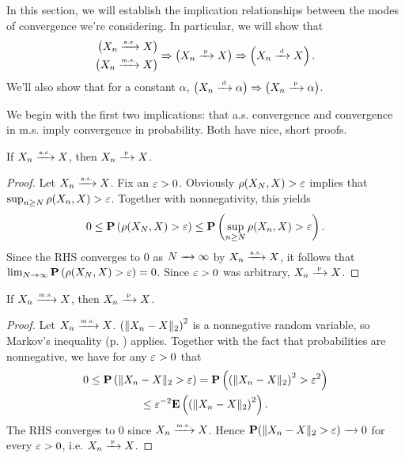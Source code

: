 \documentclass[11pt,letterpaper,reqno,oneside]{article}
\begin{document}
In this section, we will establish the implication relationships between the modes of convergence we're considering. In particular, we will show that
%
\begin{equation*}
	\begin{aligned}
		\left(X_n \xrightarrow{{\scriptscriptstyle \mathrm{a.s.}}} X\right)& \\
		\left(X_n \xrightarrow{{\scriptscriptstyle \mathrm{m.s.}}} X\right)&
	\end{aligned}
	\Rightarrow
	\left(X_n \xrightarrow{{\scriptscriptstyle \mathrm{\;p\;}}} X\right)
	\Rightarrow
	\left(X_n \xrightarrow{{\scriptscriptstyle \mathrm{\;d\;}}} X\right) .
\end{equation*}
%
We'll also show that for a constant $\alpha$, $\bigl(X_n \xrightarrow{{\scriptscriptstyle \mathrm{\;d\;}}} \alpha\bigr) \Rightarrow \bigl(X_n \xrightarrow{{\scriptscriptstyle \mathrm{\;p\;}}} \alpha\bigr)$.


We begin with the first two implications: that a.s. convergence and convergence in m.s. imply convergence in probability. Both have nice, short proofs.

\begin{proposition}
	If $X_n \xrightarrow{{\scriptscriptstyle \mathrm{a.s.}}} X$, then $X_n \xrightarrow{{\scriptscriptstyle \mathrm{\;p\;}}} X$.
\end{proposition}


\begin{proof}
	Let $X_n \xrightarrow{{\scriptscriptstyle \mathrm{a.s.}}} X$. Fix an $\varepsilon>0$. Obviously $\rho(X_N,X)>\varepsilon$ implies that $\sup_{n \geq N} \rho(X_n,X) > \varepsilon$. Together with nonnegativity, this yields
	\begin{equation*}
		0
		\leq \mathbf{P}\left( \rho(X_N,X) > \varepsilon \right)
		\leq \mathbf{P}\left( \sup_{n \geq N} \rho(X_n,X) > \varepsilon \right) .
	\end{equation*}
	Since the RHS converges to $0$ as $N \xrightarrow{\;\;\;} \infty$ by $X_n \xrightarrow{{\scriptscriptstyle \mathrm{a.s.}}} X$, it follows that $\lim_{N\to\infty} \mathbf{P}\left( \rho(X_N,X) > \varepsilon \right) = 0$. Since $\varepsilon>0$ was arbitrary, $X_n \xrightarrow{{\scriptscriptstyle \mathrm{\;p\;}}} X$.
\end{proof}


\begin{proposition}
	\label{proposition:convms_implies_convp}
	If $X_n \xrightarrow{{\scriptscriptstyle \mathrm{m.s.}}} X$, then $X_n \xrightarrow{{\scriptscriptstyle \mathrm{\;p\;}}} X$.
\end{proposition}

\begin{proof}
	Let $X_n \xrightarrow{{\scriptscriptstyle \mathrm{m.s.}}} X$. $\left(\lVert X_n-X\rVert_2\right)^2$ is a nonnegative random variable, so Markov's inequality (p. \pageref{proposition:Markovs_inequality}) applies. Together with the fact that probabilities are nonnegative, we have for any $\varepsilon>0$ that
	\begin{multline*}
		0
		\leq \mathbf{P}\left( \lVert X_n-X\rVert_2 > \varepsilon \right) 
		= \mathbf{P}\left( \left(\lVert X_n-X\rVert_2\right)^2 > \varepsilon^2 \right)
		\\
		\leq \varepsilon^{-2} \mathbf{E}\left( \left(\lVert X_n-X\rVert_2\right)^2 \right) .
	\end{multline*}
	The RHS converges to $0$ since $X_n \xrightarrow{{\scriptscriptstyle \mathrm{m.s.}}} X$. Hence $\mathbf{P}( \lVert X_n-X\rVert_2 > \varepsilon ) \xrightarrow{\;\;\;} 0$ for every $\varepsilon>0$, i.e. $X_n \xrightarrow{{\scriptscriptstyle \mathrm{\;p\;}}} X$.
\end{proof}
\end{document}

